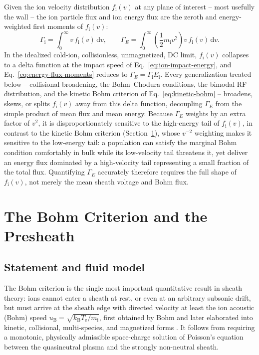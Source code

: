 Given the ion velocity distribution $f_{\mathrm{i}}(v)$ at any plane of interest -- most usefully the wall -- the ion particle flux and ion energy flux are the zeroth and energy-weighted first moments of $f_{\mathrm{i}}(v)$:
\begin{equation}
\Gamma_{\mathrm{i}} = \int_{0}^{\infty} v\, f_{\mathrm{i}}(v)\, \mathrm{d}v, \qquad \Gamma_{E} = \int_{0}^{\infty} \left( \frac{1}{2} m_{\mathrm{i}} v^{2} \right) v\, f_{\mathrm{i}}(v)\, \mathrm{d}v.
\label{eq:energy-flux-moments}
\end{equation}
In the idealized cold-ion, collisionless, unmagnetized, DC limit, $f_{\mathrm{i}}(v)$ collapses to a delta function at the impact speed of Eq.~\eqref{eq:ion-impact-energy}, and Eq.~\eqref{eq:energy-flux-moments} reduces to $\Gamma_{E} = \Gamma_{\mathrm{i}} E_{\mathrm{i}}$. Every generalization treated below -- collisional broadening, the Bohm--Chodura conditions, the bimodal RF distribution, and the kinetic Bohm criterion of Eq.~\eqref{eq:kinetic-bohm} -- broadens, skews, or splits $f_{\mathrm{i}}(v)$ away from this delta function, decoupling $\Gamma_{E}$ from the simple product of mean flux and mean energy. Because $\Gamma_{E}$ weights by an extra factor of $v^{2}$, it is disproportionately sensitive to the high-energy tail of $f_{\mathrm{i}}(v)$, in contrast to the kinetic Bohm criterion (Section~\ref{ch03-sec:bohm}), whose $v^{-2}$ weighting makes it sensitive to the low-energy tail: a population can satisfy the marginal Bohm condition comfortably in bulk while its low-velocity tail threatens it, yet deliver an energy flux dominated by a high-velocity tail representing a small fraction of the total flux. Quantifying $\Gamma_{E}$ accurately therefore requires the full shape of $f_{\mathrm{i}}(v)$, not merely the mean sheath voltage and Bohm flux.

\section{The Bohm Criterion and the Presheath}
\label{ch03-sec:bohm}

\subsection{Statement and fluid model}

The Bohm criterion is the single most important quantitative result in sheath theory: ions cannot enter a sheath at rest, or even at an arbitrary subsonic drift, but must arrive at the sheath edge with directed velocity at least the ion acoustic (Bohm) speed $u_{\mathrm{B}} = \sqrt{k_{\mathrm{B}} T_{\mathrm{e}}/m_{\mathrm{i}}}$, first obtained by Bohm and later elaborated into kinetic, collisional, multi-species, and magnetized forms \cite{ref0001,ref0004}. It follows from requiring a monotonic, physically admissible space-charge solution of Poisson's equation between the quasineutral plasma and the strongly non-neutral sheath.

